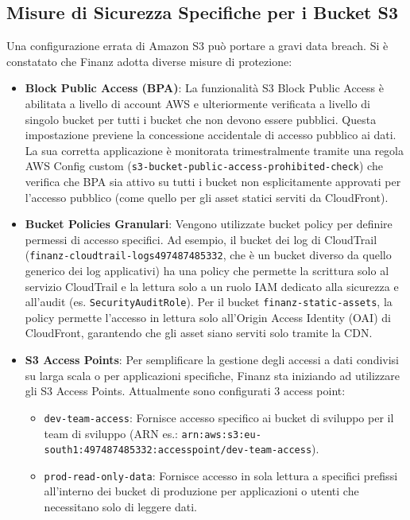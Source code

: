 \subsection{Misure di Sicurezza Specifiche per i Bucket S3}
\label{subsec:s3-security_cap2}
Una configurazione errata di Amazon S3 può portare a gravi data breach. Si è constatato che Finanz adotta diverse misure di protezione:
\begin{itemize}
    \item \textbf{Block Public Access (BPA)}: La funzionalità S3 Block Public Access è abilitata a livello di account AWS e ulteriormente verificata a livello di singolo bucket per tutti i bucket che non devono essere pubblici. Questa impostazione previene la concessione accidentale di accesso pubblico ai dati. La sua corretta applicazione è monitorata trimestralmente tramite una regola AWS Config custom (\texttt{s3-bucket-public-access-prohibited-check}) che verifica che BPA sia attivo su tutti i bucket non esplicitamente approvati per l'accesso pubblico (come quello per gli asset statici serviti da CloudFront).
    \item \textbf{Bucket Policies Granulari}: Vengono utilizzate bucket policy per definire permessi di accesso specifici. Ad esempio, il bucket dei log di CloudTrail (\texttt{finanz-cloudtrail-logs\discretionary{-}{}{-}497487485332}, che è un bucket diverso da quello generico dei log applicativi) ha una policy che permette la scrittura solo al servizio CloudTrail e la lettura solo a un ruolo IAM dedicato alla sicurezza e all'audit (es. \texttt{SecurityAuditRole}). Per il bucket \texttt{finanz-static-assets}, la policy permette l'accesso in lettura solo all'Origin Access Identity (OAI) di CloudFront, garantendo che gli asset siano serviti solo tramite la CDN.
    \item \textbf{S3 Access Points}: Per semplificare la gestione degli accessi a dati condivisi su larga scala o per applicazioni specifiche, Finanz sta iniziando ad utilizzare gli S3 Access Points. Attualmente sono configurati 3 access point:
        \begin{itemize}
            \item \texttt{dev-team-access}: Fornisce accesso specifico ai bucket di sviluppo per il team di sviluppo (ARN es.: \texttt{arn:aws:s3:\allowbreak{}eu-south\discretionary{-}{}{-}1:497487485332:\allowbreak{}accesspoint/\allowbreak{}dev-team-access}).
            \item \texttt{prod-read-only-data}: Fornisce accesso in sola lettura a specifici prefissi all'interno dei bucket di produzione per applicazioni o utenti che necessitano solo di leggere dati.

\end{itemize}
\end{itemize}
